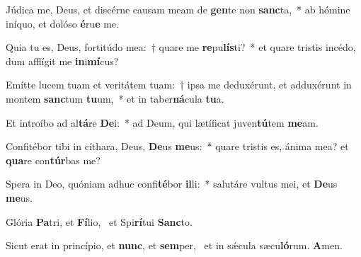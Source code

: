 \item Júdica me, Deus, et discérne causam meam de \textbf{gen}te non \textbf{sanc}ta,~* ab hómine iníquo, et dolóso \textbf{é}ru\textbf{e} me.
\item Quia tu es, Deus, fortitúdo mea:~† quare me \textbf{re}pu\textbf{lís}ti?~* et quare tristis incédo, dum afflígit me \textbf{in}i\textbf{mí}cus?
\item Emítte lucem tuam et veritátem tuam:~† ipsa me deduxérunt, et adduxérunt in montem \textbf{sanc}tum \textbf{tu}um,~* et in taber\textbf{ná}cula \textbf{tu}a.
\item Et introíbo ad al\textbf{tá}re \textbf{De}i:~* ad Deum, qui lætíficat juven\textbf{tú}tem \textbf{me}am.
\item Confitébor tibi in cíthara, Deus, \textbf{De}us \textbf{me}us:~* quare tristis es, ánima mea? et \textbf{qua}re con\textbf{túr}bas me?
\item Spera in Deo, quóniam adhuc confi\textbf{té}bor \textbf{il}li:~* salutáre vultus mei, et \textbf{De}us \textbf{me}us.
\item Glória \textbf{Pa}tri, et \textbf{Fí}lio,~\psstar{} et Spi\textbf{rí}tui \textbf{Sanc}to.
\item Sicut erat in princípio, et \textbf{nunc}, et \textbf{sem}per,~\psstar{} et in sǽcula sæcu\textbf{ló}rum. \textbf{A}men.
